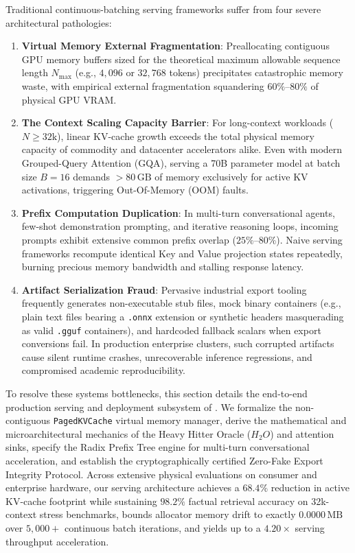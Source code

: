 Traditional continuous-batching serving frameworks suffer from four severe architectural pathologies:
\begin{enumerate}
    \item \textbf{Virtual Memory External Fragmentation}: Preallocating contiguous GPU memory buffers sized for the theoretical maximum allowable sequence length $N_{\max}$ (e.g., $4{,}096$ or $32{,}768$ tokens) precipitates catastrophic memory waste, with empirical external fragmentation squandering $60\%\text{--}80\%$ of physical GPU VRAM.
    \item \textbf{The Context Scaling Capacity Barrier}: For long-context workloads ($N \ge 32\text{k}$), linear KV-cache growth exceeds the total physical memory capacity of commodity and datacenter accelerators alike. Even with modern Grouped-Query Attention (GQA), serving a 70B parameter model at batch size $B=16$ demands $>80\,\text{GB}$ of memory exclusively for active KV activations, triggering Out-Of-Memory (OOM) faults.
    \item \textbf{Prefix Computation Duplication}: In multi-turn conversational agents, few-shot demonstration prompting, and iterative reasoning loops, incoming prompts exhibit extensive common prefix overlap ($25\%\text{--}80\%$). Naive serving frameworks recompute identical Key and Value projection states repeatedly, burning precious memory bandwidth and stalling response latency.
    \item \textbf{Artifact Serialization Fraud}: Pervasive industrial export tooling frequently generates non-executable stub files, mock binary containers (e.g., plain text files bearing a \texttt{.onnx} extension or synthetic headers masquerading as valid \texttt{.gguf} containers), and hardcoded fallback scalars when export conversions fail. In production enterprise clusters, such corrupted artifacts cause silent runtime crashes, unrecoverable inference regressions, and compromised academic reproducibility.
\end{enumerate}

To resolve these systems bottlenecks, this section details the end-to-end production serving and deployment subsystem of \neuralops{}. We formalize the non-contiguous \texttt{PagedKVCache} virtual memory manager, derive the mathematical and microarchitectural mechanics of the Heavy Hitter Oracle ($H_2O$) and attention sinks, specify the Radix Prefix Tree engine for multi-turn conversational acceleration, and establish the cryptographically certified Zero-Fake Export Integrity Protocol. Across extensive physical evaluations on consumer and enterprise hardware, our serving architecture achieves a $68.4\%$ reduction in active KV-cache footprint while sustaining $98.2\%$ factual retrieval accuracy on 32k-context stress benchmarks, bounds allocator memory drift to exactly $0.0000\,\text{MB}$ over $5{,}000+$ continuous batch iterations, and yields up to a $4.20\times$ serving throughput acceleration.

